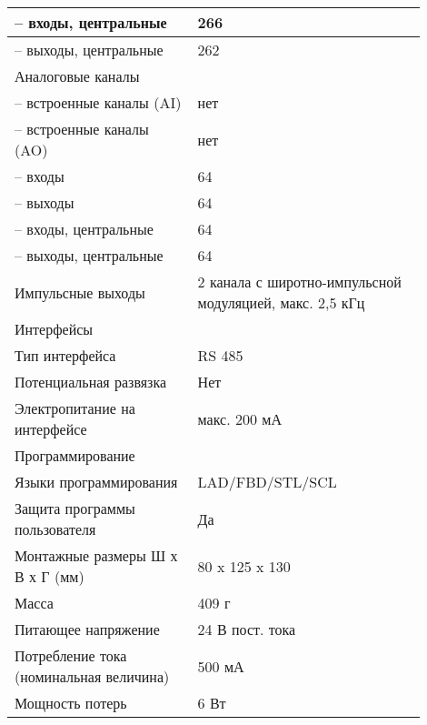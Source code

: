 \begin{table}[h!]
\begin{center}
\begin{tabular}{|p{0.4\linewidth}|p{0.5\linewidth}|}
-- входы, центральные             & 266                                                     \\
\hline    
-- выходы, центральные            & 262                                                     \\
\hline    
Аналоговые каналы                 &                                                         \\
\hline    
-- встроенные каналы (AI)         & нет                                                     \\
\hline    
-- встроенные каналы (AO)         & нет                                                     \\
\hline    
-- входы                          & 64                                                      \\
\hline    
-- выходы                         & 64                                                      \\
\hline    
-- входы, центральные             & 64                                                      \\
\hline    
-- выходы, центральные            & 64                                                      \\
\hline
Импульсные выходы                 & 2 канала с широтно-импульсной модуляцией, макс. 2,5 кГц \\
\hline    
Интерфейсы                        &                                                         \\
\hline    
Тип интерфейса                    & RS 485                                                  \\
\hline    
Потенциальная развязка            & Нет                                                     \\
\hline    
Электропитание на интерфейсе      & макс. 200 мА                                            \\
\hline    
Программирование                  &                                                         \\
\hline    
Языки программирования            & LAD/FBD/STL/SCL                                         \\
\hline    
Защита программы пользователя     & Да                                                      \\
\hline    
Монтажные размеры Ш х В х Г (мм)  & 80 x 125 x 130                                          \\
\hline    
Масса                             & 409 г                                                   \\
\hline    
Питающее напряжение               & 24 В пост. тока                                         \\
\hline
Потребление тока 
(номинальная величина)            & 500 мА                                                  \\
\hline
Мощность потерь                   & 6 Вт                                                    \\
\hline


\end{tabular}
\end{center}
\end{table}
